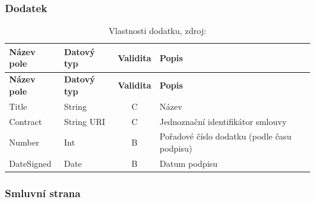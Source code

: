 \subsubsection*{Dodatek}

\begin{center}
\begin{longtable}{lp{20mm}cp{65mm}}
\label{grid_mlmmh} \\
\multicolumn{1}{l}{\textbf{Název pole}} & 
\multicolumn{1}{l}{\textbf{Datový typ}} & 
\multicolumn{1}{l}{\textbf{Validita}} & 
\multicolumn{1}{l}{\textbf{Popis}} \\ \hline 
\endfirsthead
\multicolumn{1}{l}{\textbf{Název pole}} & 
\multicolumn{1}{l}{\textbf{Datový typ}} & 
\multicolumn{1}{l}{\textbf{Validita}} & 
\multicolumn{1}{l}{\textbf{Popis}} \\ \hline 
\hline
\endhead
\endfoot
\caption{Vlastnosti dodatku, zdroj:\protect\cite{metodika}}
\endlastfoot
\rowcolor{validateC}Title & String & C & Název \\
\rowcolor{validateC}Contract & String URI & C & Jednoznační identifikátor smlouvy \\
\rowcolor{validateB}Number & Int & B & Pořadové číslo dodatku (podle času podpisu) \\
\rowcolor{validateB}DateSigned & Date & B & Datum podpisu \\
\end{longtable}
\end{center}

\newpage

\subsubsection*{Smluvní strana}

